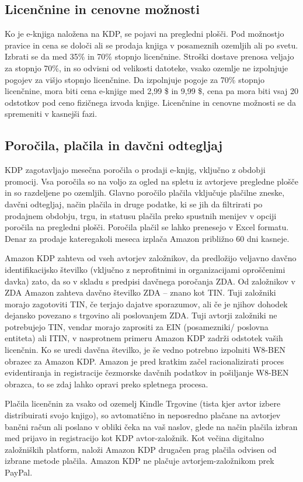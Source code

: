 \documentclass[a4paper, 12pt]{book}
\begin{document}
\subsection{Licenčnine in cenovne možnosti}
Ko je e-knjiga naložena na KDP, se pojavi na pregledni plošči. Pod možnostjo pravice in cena se določi ali se prodaja  knjiga v posameznih ozemljih ali po svetu. Izbrati se da med 35\% in 70\% stopnjo licenčnine. Stroški dostave prenosa veljajo za stopnjo 70\%, in so odvisni od velikosti datoteke, vsako ozemlje ne izpolnjuje pogojev za višjo stopnjo licenčnine. Da izpolnjuje pogoje za 70\% stopnjo licenčnine, mora biti cena e-knjige med 2,99 \$ in 9,99 \$, cena pa mora biti vsaj 20 odstotkov pod ceno fizičnega izvoda knjige. Licenčnine in cenovne možnosti se da spremeniti v kasnejši fazi. 

\subsection{Poročila, plačila in davčni odtegljaj}
KDP zagotavljajo mesečna poročila o prodaji e-knjig, vključno z obdobji promocij. Vsa poročila so na voljo za ogled na spletu iz avtorjeve pregledne plošče in so razdeljene po ozemljih. Glavno poročilo plačila vključuje plačilne zneske, davčni odtegljaj, način plačila in druge podatke, ki se jih da filtrirati po prodajnem obdobju, trgu, in statusu plačila preko spustnih menijev v opciji poročila na pregledni plošči. Poročila plačil se lahko prenesejo v Excel formatu. Denar za prodaje kateregakoli meseca izplača Amazon približno 60 dni kasneje.

Amazon KDP zahteva od vseh avtorjev založnikov, da predložijo veljavno davčno identifikacijsko številko (vključno z neprofitnimi in organizacijami oproščenimi davka) zato, da so v skladu s predpisi davčnega poročanja ZDA. Od založnikov v ZDA Amazon zahteva davčno številko ZDA – znano kot TIN. Tuji založniki morajo zagotoviti TIN, če terjajo dajatve sporazumov, ali če je njihov dohodek dejansko povezano s trgovino ali poslovanjem ZDA. Tuji avtorji založniki ne potrebujejo TIN, vendar morajo zaprositi za EIN (posamezniki/ poslovna entiteta) ali ITIN, v nasprotnem primeru Amazon KDP zadrži odstotek vaših licenčnin. Ko se uredi davčna številko, je še vedno potrebno izpolniti W8-BEN obrazec za Amazon KDP. Amazon je pred kratkim začel racionalizirati proces evidentiranja in registracije čezmorske davčnih podatkov in pošiljanje W8-BEN obrazca, to se zdaj lahko opravi preko spletnega procesa. 

Plačila licenčnin za vsako od ozemelj Kindle Trgovine (tista kjer avtor izbere distribuirati svojo knjigo), so avtomatično in neposredno plačane na avtorjev bančni račun ali poslano v obliki čeka  na vaš naslov, glede na način plačila izbran med prijavo in registracijo kot KDP avtor-založnik. Kot večina digitalno založniških platform, naloži Amazon KDP drugačen prag plačila odvisen od izbrane metode plačila. Amazon KDP ne plačuje avtorjem-založnikom prek PayPal. 
\end{document}
